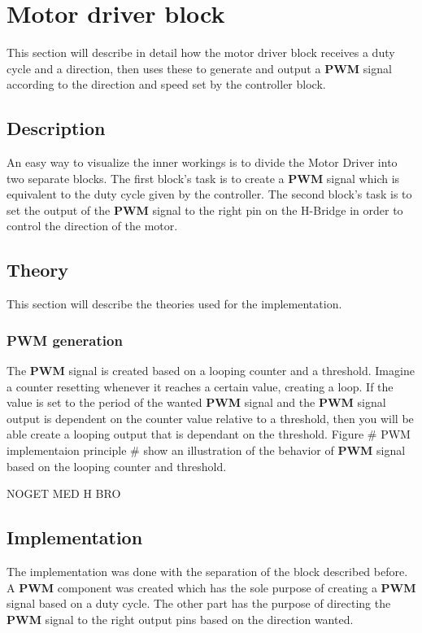 \section{Motor driver block}

This section will describe in detail how the motor driver block receives a duty cycle and a direction, then uses these to generate and output a \textbf{PWM} signal according to the direction and speed set by the controller block.

\subsection{Description}

An easy way to visualize the inner workings is to divide the Motor Driver into two separate blocks. The first block’s task is to create a \textbf{PWM} signal which is equivalent to the duty cycle given by the controller. The second block’s task is to set the output of the \textbf{PWM} signal to the right pin on the H-Bridge in order to control the direction of the motor.

\subsection{Theory}

This section will describe the theories used for the implementation.

\subsubsection{PWM generation}

The \textbf{PWM} signal is created based on a looping counter and a threshold. Imagine a counter resetting whenever it reaches a certain value, creating a loop. If the value is set to the period of the wanted \textbf{PWM} signal and the \textbf{PWM} signal output is dependent on the counter value relative to a threshold, then you will be able create a looping output that is dependant on the threshold. Figure \# PWM implementaion principle \# show an illustration of the behavior of \textbf{PWM} signal based on the looping counter and threshold.

NOGET MED H BRO

\subsection{Implementation}

The implementation was done with the separation of the block described before. A \textbf{PWM} component was created which has the sole purpose of creating a \textbf{PWM} signal based on a duty cycle. The other part has the purpose of directing the \textbf{PWM} signal to the right output pins based on the direction wanted.

